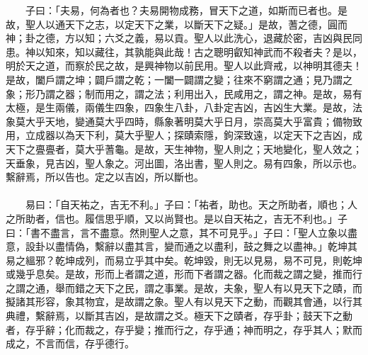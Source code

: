 　　子曰：「夫易，何為者也？夫易開物成務，冒天下之道，如斯而已者也。是故，聖人以通天下之志，以定天下之業，以斷天下之疑。」是故，蓍之德，圓而神；卦之德，方以知；六爻之義，易以貢。聖人以此洗心，退藏於密，吉凶與民同患。神以知來，知以藏往，其孰能與此哉！古之聰明叡知神武而不殺者夫？是以，明於天之道，而察於民之故，是興神物以前民用。聖人以此齊戒，以神明其德夫！是故，闔戶謂之坤；闢戶謂之乾；一闔一闢謂之變；往來不窮謂之通；見乃謂之象；形乃謂之器；制而用之，謂之法；利用出入，民咸用之，謂之神。是故，易有太極，是生兩儀，兩儀生四象，四象生八卦，八卦定吉凶，吉凶生大業。是故，法象莫大乎天地，變通莫大乎四時，縣象著明莫大乎日月，崇高莫大乎富貴；備物致用，立成器以為天下利，莫大乎聖人；探賾索隱，鉤深致遠，以定天下之吉凶，成天下之亹亹者，莫大乎蓍龜。是故，天生神物，聖人則之；天地變化，聖人效之；天垂象，見吉凶，聖人象之。河出圖，洛出書，聖人則之。易有四象，所以示也。繫辭焉，所以告也。定之以吉凶，所以斷也。
\\\\
　　易曰：「自天祐之，吉无不利。」子曰：「祐者，助也。天之所助者，順也；人之所助者，信也。履信思乎順，又以尚賢也。是以自天祐之，吉无不利也。」子曰：「書不盡言，言不盡意。然則聖人之意，其不可見乎。」子曰：「聖人立象以盡意，設卦以盡情偽，繫辭以盡其言，變而通之以盡利，鼓之舞之以盡神。」乾坤其易之縕邪？乾坤成列，而易立乎其中矣。乾坤毀，則无以見易，易不可見，則乾坤或幾乎息矣。是故，形而上者謂之道，形而下者謂之器。化而裁之謂之變，推而行之謂之通，舉而錯之天下之民，謂之事業。是故，夫象，聖人有以見天下之賾，而擬諸其形容，象其物宜，是故謂之象。聖人有以見天下之動，而觀其會通，以行其典禮，繫辭焉，以斷其吉凶，是故謂之爻。極天下之賾者，存乎卦；鼓天下之動者，存乎辭；化而裁之，存乎變；推而行之，存乎通；神而明之，存乎其人；默而成之，不言而信，存乎德行。

